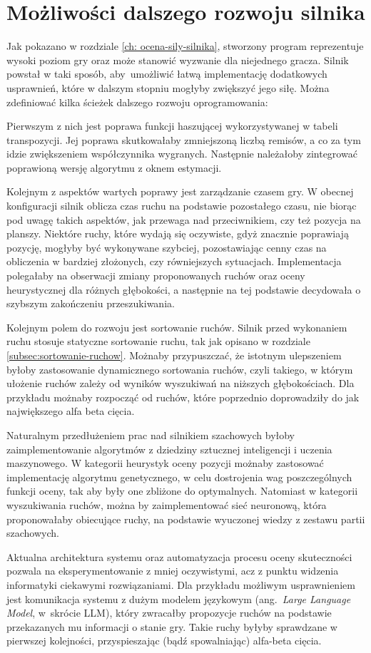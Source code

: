 \section {Możliwości dalszego rozwoju silnika}
\label {sec: dalszy-rozwoj}

Jak pokazano w rozdziale \ref{ch: ocena-sily-silnika}, stworzony program reprezentuje wysoki poziom gry oraz może stanowić wyzwanie dla niejednego gracza.
Silnik powstał w taki sposób, aby~umożliwić łatwą implementację dodatkowych usprawnień, które w dalszym stopniu mogłyby zwiększyć jego siłę.
Można zdefiniować kilka ścieżek dalszego rozwoju oprogramowania:

Pierwszym z nich jest poprawa funkcji haszującej wykorzystywanej w tabeli transpozycji.
Jej poprawa skutkowałaby zmniejszoną liczbą remisów, a co za tym idzie zwiększeniem współczynnika wygranych.
Następnie należałoby zintegrować poprawioną wersję algorytmu z oknem estymacji.

Kolejnym z aspektów wartych poprawy jest zarządzanie czasem gry.
W obecnej konfiguracji silnik oblicza czas ruchu na podstawie pozostałego czasu, nie biorąc pod uwagę takich aspektów, jak przewaga nad przeciwnikiem, czy też pozycja na planszy.
Niektóre ruchy, które wydają się oczywiste, gdyż znacznie poprawiają pozycję, mogłyby być wykonywane szybciej, pozostawiając cenny czas na obliczenia w bardziej złożonych, czy równiejszych sytuacjach.
Implementacja polegałaby na obserwacji zmiany proponowanych ruchów oraz oceny heurystycznej dla różnych głębokości, a następnie na tej podstawie decydowała o szybszym zakończeniu przeszukiwania.

Kolejnym polem do rozwoju jest sortowanie ruchów.
Silnik przed wykonaniem ruchu stosuje statyczne sortowanie ruchu, tak jak opisano w rozdziale \ref {subsec:sortowanie-ruchow}.
Możnaby przypuszczać, że istotnym ulepszeniem byłoby zastosowanie dynamicznego sortowania ruchów, czyli takiego, w którym ułożenie ruchów zależy od wyników wyszukiwań na niższych głębokościach.
Dla przykładu możnaby rozpocząć od ruchów, które poprzednio doprowadziły do jak największego alfa beta cięcia.

Naturalnym przedłużeniem prac nad silnikiem szachowych byłoby zaimplementowanie algorytmów z dziedziny sztucznej inteligencji i uczenia maszynowego.
W kategorii heurystyk oceny pozycji możnaby zastosować implementację algorytmu genetycznego, w celu dostrojenia wag poszczególnych funkcji oceny, tak aby były one zbliżone do optymalnych.
Natomiast w kategorii wyszukiwania ruchów, można by zaimplementować sieć neuronową, która proponowałaby obiecujące ruchy, na podstawie wyuczonej wiedzy z zestawu partii szachowych.

Aktualna architektura systemu oraz automatyzacja procesu oceny skuteczności pozwala na eksperymentowanie z mniej oczywistymi, acz z punktu widzenia informatyki ciekawymi rozwiązaniami.
Dla przykładu możliwym usprawnieniem jest komunikacja systemu z dużym modelem językowym (ang.~\emph{Large Language Model}, w~skrócie LLM), który zwracałby propozycje ruchów na podstawie przekazanych mu informacji o stanie gry.
Takie ruchy byłyby sprawdzane w pierwszej kolejności, przyspieszając (bądź spowalniając) alfa-beta cięcia.



